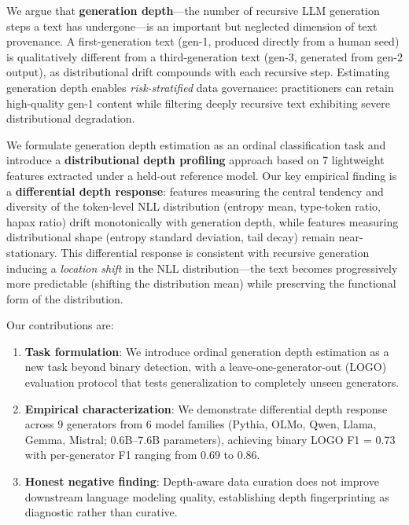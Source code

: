 \documentclass[11pt,a4paper]{article}
\begin{document}
We argue that \textbf{generation depth}---the number of recursive LLM generation steps a text has undergone---is an important but neglected dimension of text provenance. A first-generation text (gen-1, produced directly from a human seed) is qualitatively different from a third-generation text (gen-3, generated from gen-2 output), as distributional drift compounds with each recursive step. Estimating generation depth enables \emph{risk-stratified} data governance: practitioners can retain high-quality gen-1 content while filtering deeply recursive text exhibiting severe distributional degradation.

We formulate generation depth estimation as an ordinal classification task and introduce a \textbf{distributional depth profiling} approach based on 7 lightweight features extracted under a held-out reference model. Our key empirical finding is a \textbf{differential depth response}: features measuring the central tendency and diversity of the token-level NLL distribution (entropy mean, type-token ratio, hapax ratio) drift monotonically with generation depth, while features measuring distributional shape (entropy standard deviation, tail decay) remain near-stationary. This differential response is consistent with recursive generation inducing a \emph{location shift} in the NLL distribution---the text becomes progressively more predictable (shifting the distribution mean) while preserving the functional form of the distribution.

Our contributions are:
\begin{enumerate}
    \item \textbf{Task formulation}: We introduce ordinal generation depth estimation as a new task beyond binary detection, with a leave-one-generator-out (LOGO) evaluation protocol that tests generalization to completely unseen generators.
    \item \textbf{Empirical characterization}: We demonstrate differential depth response across 9 generators from 6 model families (Pythia, OLMo, Qwen, Llama, Gemma, Mistral; 0.6B--7.6B parameters), achieving binary LOGO F1 = 0.73 with per-generator F1 ranging from 0.69 to 0.86.
    \item \textbf{Honest negative finding}: Depth-aware data curation does not improve downstream language modeling quality, establishing depth fingerprinting as diagnostic rather than curative.
\end{enumerate}

\end{document}
